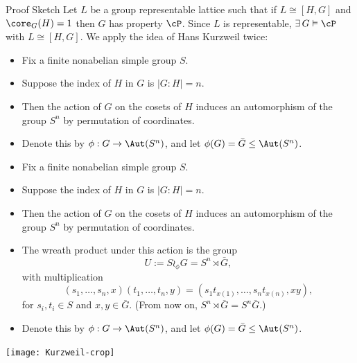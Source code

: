 \begin{frame}[label=IEPropsLemma2Alt]{}
\alert{Proof Sketch}
\vskip2mm
  Let $L$ be a group representable lattice such that if $L\cong [H,G]$ and
  $\core_G(H)=1$ then $G$ has property $\cP$.  
\vskip4mm
  Since $L$ is representable, $\exists\, G \vDash \cP$ with $L
  \cong [H,G]$. 
\vskip4mm
  We apply the idea of Hans Kurzweil twice:
  \begin{itemize}
  \item Fix a finite nonabelian simple group $S$. 
\vskip2mm
\item Suppose the index of $H$ in $G$ is $|G:H| = n$.
\vskip2mm
\item Then the action of $G$ on the cosets of $H$ induces an automorphism of the
group $S^n$ by permutation of coordinates.  
\vskip2mm
\item
Denote this by  $\phi: G \rightarrow \Aut(S^n)$, 
  and let $\phi(G) = \bar{G} \leq \Aut(S^n)$.  
  \end{itemize}
\end{frame}


\begin{frame}[label=IEPropsLemma2Alt]{}
  \begin{itemize}
  \item Fix a finite nonabelian simple group $S$. 
\vskip2mm
\item Suppose the index of $H$ in $G$ is $|G:H| = n$.
\vskip2mm
\item Then the action of $G$ on the cosets of $H$ induces an automorphism of the
group $S^n$ by permutation of coordinates.  
\vskip2mm
\item  The wreath product under this action is the group
  \[
  U := S\wr_\phi G =  S^n \rtimes \bar{G}, %
  \]
  with multiplication
  \[
  (s_1, \dots, s_n, x) (t_1, \dots, t_n, y) = 
  (s_1 t_{x(1)}, \dots, s_nt_{x(n)}, x y),
  \]
  for $s_i, t_i \in S$ and $x, y \in \bar{G}$.
  (From now on, $S^n \rtimes \bar{G} = S^n\bar{G}$.)
\item Denote this by  $\phi: G \rightarrow \Aut(S^n)$, 
  and let $\phi(G) = \bar{G} \leq \Aut(S^n)$.  
  \end{itemize}
\end{frame}


\begin{frame}[fragile,label=IEPropsLemma2Prezi]{}
  \begin{center}
\texttt{[image: Kurzweil-crop]}
  \end{center}
\end{frame}


